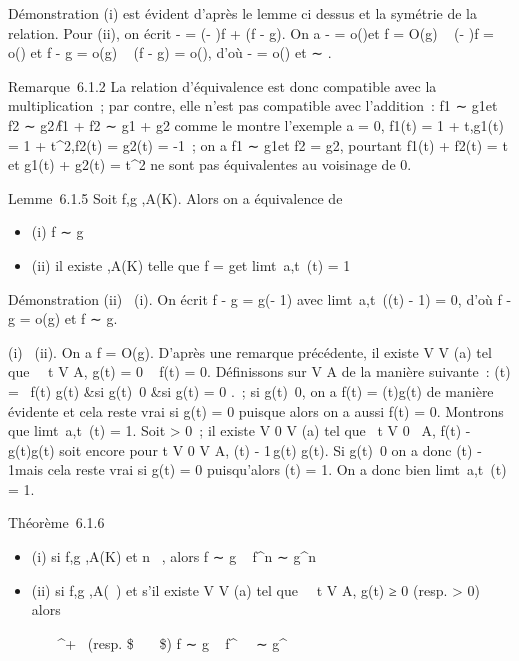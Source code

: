 Démonstration (i) est évident d'après le lemme ci dessus et la symétrie
de la relation. Pour (ii), on écrit \phif - \psig = (\phi - \psi)f + \psi(f - g). On a
\phi - \psi = o(\psi)\text et f = O(g) \rigtharrow~ (\phi - \psi)f = o(\psig) et f
- g = o(g) \rigtharrow~ \psi(f - g) = o(\psig), d'où \phif - \psig = o(\psig) et \phif ∼ \psig.

Remarque~6.1.2 La relation d'équivalence est donc compatible avec la
multiplication~; par contre, elle n'est pas compatible avec l'addition~:
f1 ∼ g1\text et f2 ∼
g2\rigtharrow~̸f1 + f2 ∼ g1 + g2
comme le montre l'exemple a = 0, f1(t) = 1 + t,g1(t)
= 1 + t^2,f2(t) = g2(t) = -1~; on a
f1 ∼ g1\text et f2 =
g2, pourtant f1(t) + f2(t) = t et
g1(t) + g2(t) = t^2 ne sont pas
équivalentes au voisinage de 0.

Lemme~6.1.5 Soit f,g ,A(K). Alors on a équivalence de

\begin{itemize}
\itemsep1pt\parskip0pt
\item
  (i) f ∼ g
\item
  (ii) il existe \phi {},A(K) telle que f = g\phi et
  limt\rightarrow~a,t\inA~\phi(t) = 1
\end{itemize}

Démonstration (ii) \rigtharrow~(i). On écrit f - g = g(\phi - 1) avec
limt\rightarrow~a,t\inA~(\phi(t) - 1) = 0, d'où f - g
= o(g) et f ∼ g.

(i) \rigtharrow~(ii). On a f = O(g). D'après une remarque précédente, il existe V \in
V (a) tel que \forall~~t \in V \bigcap A, g(t) = 0 \rigtharrow~ f(t) = 0.
Définissons \phi sur V \bigcap A de la manière suivante~: \phi(t) =
\left \ \cases  f(t)
\over g(t) &si g(t)\neq~0
 &si g(t) = 0  \right .~; si
g(t)\neq~0, on a f(t) = \phi(t)g(t) de manière
évidente et cela reste vrai si g(t) = 0 puisque alors on a aussi f(t) =
0. Montrons que limt\rightarrow~a,t\inA~\phi(t) = 1.
Soit \epsilon \textgreater{} 0~; il existe V 0 \in V (a) tel que
\forall~t \in V 0~ \bigcap A, \textbar{}f(t) -
g(t)\textbar{}\leq \epsilon\textbar{}g(t)\textbar{} soit encore pour t \in V
0 \bigcap V \bigcap A, \textbar{}\phi(t) -
1\textbar{}\,\textbar{}g(t)\textbar{}\leq
\epsilon\textbar{}g(t)\textbar{}. Si g(t)\neq~0 on a
donc \textbar{}\phi(t) - 1\textbar{}\leq \epsilon mais cela reste vrai si g(t) = 0
puisqu'alors \phi(t) = 1. On a donc bien
limt\rightarrow~a,t\inA~\phi(t) = 1.

Théorème~6.1.6

\begin{itemize}
\item
  (i) si f,g ,A(K) et n \in {}~, alors f ∼ g \rigtharrow~ f^n ∼
  g^n
\item
  (ii) si f,g ,A(~) et s'il existe V \in V (a) tel que
  \forall~~t \in V \bigcap A, g(t) ≥ 0 (resp. \textgreater{}
  0) alors

  \forall~\alpha~ \in {}~^+~\text
  (resp. \$\forall~\alpha~ \in {}~\$) f ∼ g \rigtharrow~ f^\alpha~~
  ∼ g^\alpha~
\end{itemize}

